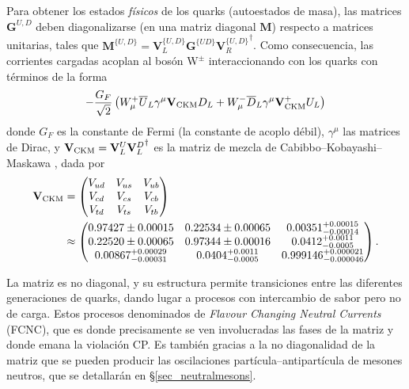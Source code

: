 Para obtener los estados \emph{físicos} de los quarks (autoestados de masa), las matrices $\mathbf{G}^{U,D}$ deben diagonalizarse (en una matriz diagonal $\mathbf{M}$) respecto a matrices unitarias, tales que $\mathbf{M}^{\{U,D\}}=\mathbf{V}_L^{\{U,D\}} \mathbf{G}^{\{UD\}} {\mathbf{V}_R^{\{U,D\}}}^{\dagger}$.
%
Como consecuencia, las corrientes cargadas acoplan al bosón $\mathrm{W^{\pm}}$ interaccionando con los quarks con términos de la forma
\begin{equation}
	-\frac{G_F}{\sqrt{2}} \left( W_{\mu}^+ \overline{U}_L \gamma^{\mu}  \mathbf{V}_{\text{CKM}} D_L + W_{\mu}^- \overline{D}_L \gamma^{\mu}  \mathbf{V}_{\text{CKM}}^+ U_L \right)
\end{equation}
donde $G_F$ es la constante de Fermi (la constante de acoplo débil), $\gamma^{\mu}$ las matrices de Dirac, y $\mathbf{V}_{\text{CKM}}= \mathbf{V}_L^U {\mathbf{V}_L^D}^{\dagger}$ es la matriz de mezcla de Cabibbo--Kobayashi--Maskawa \cite{pdg2018}, dada por \color{new}
\begin{align}
  \mathbf{V}_{\text{CKM}}  &= \begin{pmatrix}
	V_{ud} & V_{us} & V_{ub} \\
	V_{cd} & V_{cs} & V_{cb} \\
	V_{td} & V_{ts} & V_{tb} \\
\end{pmatrix} \\ & \approx \begin{pmatrix}
0.97427 \pm 0.00015 & 0.22534 \pm 0.00065 & 0.00351^{+0.00015}_{-0.00014} \\
0.22520 \pm 0.00065 & 0.97344 \pm 0.00016 & 0.0412^{+0.0011}_{-0.0005} \\
0.00867^{+0.00029}_{-0.00031} & 0.0404^{+0.0011}_{-0.0005} & 0.999146^{+0.000021}_{-0.000046}
\end{pmatrix}. \nonumber
\end{align}

La matriz es no diagonal, y su estructura permite transiciones entre las diferentes generaciones de quarks, dando lugar a procesos con intercambio de sabor pero no de carga. Estos procesos denominados de \textit{Flavour Changing Neutral Currents} (FCNC), que es donde precisamente se ven involucradas las fases de la matriz y donde emana la violación CP. Es también gracias a la no diagonalidad de la matriz que se pueden producir las oscilaciones partícula--antipartícula de mesones neutros, que se detallarán en \S \ref{sec_neutralmesons}.



